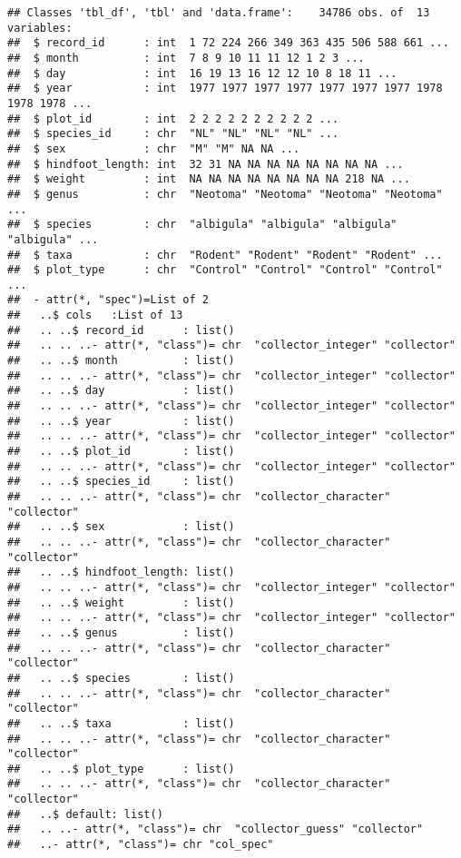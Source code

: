 \documentclass[]{article}
\begin{document}
\begin{verbatim}
## Classes 'tbl_df', 'tbl' and 'data.frame':    34786 obs. of  13 variables:
##  $ record_id      : int  1 72 224 266 349 363 435 506 588 661 ...
##  $ month          : int  7 8 9 10 11 11 12 1 2 3 ...
##  $ day            : int  16 19 13 16 12 12 10 8 18 11 ...
##  $ year           : int  1977 1977 1977 1977 1977 1977 1977 1978 1978 1978 ...
##  $ plot_id        : int  2 2 2 2 2 2 2 2 2 2 ...
##  $ species_id     : chr  "NL" "NL" "NL" "NL" ...
##  $ sex            : chr  "M" "M" NA NA ...
##  $ hindfoot_length: int  32 31 NA NA NA NA NA NA NA NA ...
##  $ weight         : int  NA NA NA NA NA NA NA NA 218 NA ...
##  $ genus          : chr  "Neotoma" "Neotoma" "Neotoma" "Neotoma" ...
##  $ species        : chr  "albigula" "albigula" "albigula" "albigula" ...
##  $ taxa           : chr  "Rodent" "Rodent" "Rodent" "Rodent" ...
##  $ plot_type      : chr  "Control" "Control" "Control" "Control" ...
##  - attr(*, "spec")=List of 2
##   ..$ cols   :List of 13
##   .. ..$ record_id      : list()
##   .. .. ..- attr(*, "class")= chr  "collector_integer" "collector"
##   .. ..$ month          : list()
##   .. .. ..- attr(*, "class")= chr  "collector_integer" "collector"
##   .. ..$ day            : list()
##   .. .. ..- attr(*, "class")= chr  "collector_integer" "collector"
##   .. ..$ year           : list()
##   .. .. ..- attr(*, "class")= chr  "collector_integer" "collector"
##   .. ..$ plot_id        : list()
##   .. .. ..- attr(*, "class")= chr  "collector_integer" "collector"
##   .. ..$ species_id     : list()
##   .. .. ..- attr(*, "class")= chr  "collector_character" "collector"
##   .. ..$ sex            : list()
##   .. .. ..- attr(*, "class")= chr  "collector_character" "collector"
##   .. ..$ hindfoot_length: list()
##   .. .. ..- attr(*, "class")= chr  "collector_integer" "collector"
##   .. ..$ weight         : list()
##   .. .. ..- attr(*, "class")= chr  "collector_integer" "collector"
##   .. ..$ genus          : list()
##   .. .. ..- attr(*, "class")= chr  "collector_character" "collector"
##   .. ..$ species        : list()
##   .. .. ..- attr(*, "class")= chr  "collector_character" "collector"
##   .. ..$ taxa           : list()
##   .. .. ..- attr(*, "class")= chr  "collector_character" "collector"
##   .. ..$ plot_type      : list()
##   .. .. ..- attr(*, "class")= chr  "collector_character" "collector"
##   ..$ default: list()
##   .. ..- attr(*, "class")= chr  "collector_guess" "collector"
##   ..- attr(*, "class")= chr "col_spec"
\end{verbatim}
\end{document}
